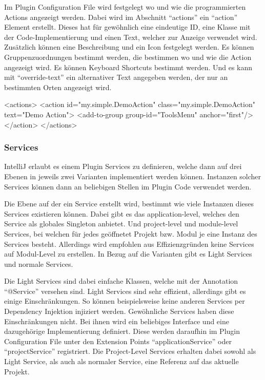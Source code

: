   Im Plugin Configuration File wird festgelegt wo und wie die programmierten Actions angezeigt
  werden. Dabei wird im Abschnitt \enquote{actions} ein \enquote{action} Element erstellt.
  Dieses hat für gewöhnlich eine eindeutige ID, eine Klasse mit der Code-Implementierung und
  einen Text, welcher zur Anzeige verwendet wird. Zusätzlich können eine Beschreibung und
  ein Icon festgelegt werden. Es können Gruppenzuordnungen bestimmt werden, die bestimmen
  wo und wie die Action angezeigt wird. Es können Keyboard Shortcuts bestimmt werden. Und
  es kann mit \enquote{override-text} ein alternativer Text angegeben werden, der nur an
  bestimmten Orten angezeigt wird.
  
  \begin{XmlCode}
    <actions>
        <action id="my.simple.DemoAction"
                class="my.simple.DemoAction" 
                text="Demo Action">
            <add-to-group group-id="ToolsMenu" anchor="first"/>
        </action>
    </actions>
  \end{XmlCode}

\subsubsection{Services}
  IntelliJ erlaubt es einem Plugin Services zu definieren, welche dann auf drei Ebenen
  in jeweils zwei Varianten implementiert werden können. Instanzen solcher Services können
  dann an beliebigen Stellen im Plugin Code verwendet werden.

  Die Ebene auf der ein Service erstellt wird, bestimmt wie viele Instanzen dieses 
  Services existieren können. Dabei gibt es das application-level, welches den Service
  als globales Singleton anbietet. Und project-level und module-level Services, bei welchen
  für jedes geöffnetet Projekt bzw. Modul je eine Instanz des Services besteht. Allerdings 
  wird empfohlen aus Effizienzgründen keine Services auf Modul-Level zu erstellen.
  In Bezug auf die Varianten gibt es Light Services und normale Services.

  Die Light Services sind dabei einfache Klassen, welche mit der Annotation \enquote{@Service}
  versehen sind. Light Services sind sehr effizient, allerdings gibt es einige Einschränkungen.
  So können beispielsweise keine anderen Services per Dependency Injektion injiziert werden.
  Gewöhnliche Services haben diese Einschränkungen nicht. Bei ihnen wird ein beliebiges Interface und
  eine dazugehörige Implementierung definiert. Diese werden daraufhin im Plugin Configuration File
  unter den Extension Points \enquote{applicationService} oder \enquote{projectService} registriert.
  Die Project-Level Services erhalten dabei sowohl als Light Service, als auch als normaler Service, 
  eine Referenz auf das aktuelle Projekt.

